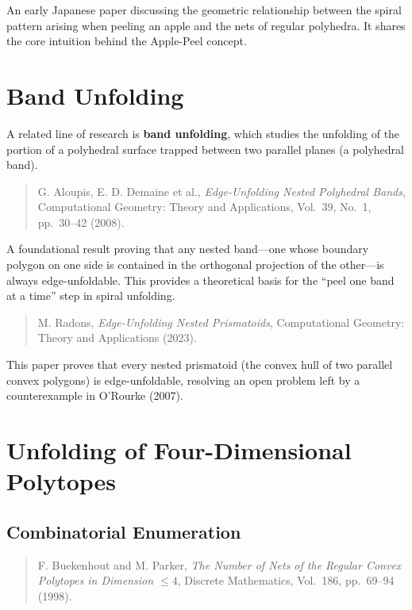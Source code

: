 \documentclass[a4paper,11pt]{article}
\begin{document}
An early Japanese paper discussing the geometric relationship between the spiral pattern
arising when peeling an apple and the nets of regular polyhedra.
It shares the core intuition behind the Apple-Peel concept.

\section{Band Unfolding}

A related line of research is \textbf{band unfolding}, which studies the unfolding of the
portion of a polyhedral surface trapped between two parallel planes (a polyhedral band).

\begin{quotation}\noindent
  G. Aloupis, E. D. Demaine et al.,
  \textit{Edge-Unfolding Nested Polyhedral Bands},
  Computational Geometry: Theory and Applications, Vol.~39, No.~1, pp.~30--42 (2008).
\end{quotation}

A foundational result proving that any nested band---one whose boundary polygon on one side
is contained in the orthogonal projection of the other---is always edge-unfoldable.
This provides a theoretical basis for the ``peel one band at a time'' step in spiral unfolding.

\begin{quotation}\noindent
  M. Radons,
  \textit{Edge-Unfolding Nested Prismatoids},
  Computational Geometry: Theory and Applications (2023).
\end{quotation}

This paper proves that every nested prismatoid (the convex hull of two parallel convex polygons)
is edge-unfoldable, resolving an open problem left by a counterexample in O'Rourke (2007).

\section{Unfolding of Four-Dimensional Polytopes}

\subsection{Combinatorial Enumeration}

\begin{quotation}\noindent
  F. Buekenhout and M. Parker,
  \textit{The Number of Nets of the Regular Convex Polytopes in Dimension $\leq 4$},
  Discrete Mathematics, Vol.~186, pp.~69--94 (1998).
\end{quotation}
\end{document}
